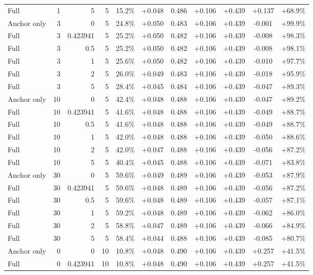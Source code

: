 \begin{table}[htbp]
\begin{tabular}{lrrrccccccc}
Full & 1 & 5 & 5 & 15.2\% & +0.048 & 0.486 & +0.106 & +0.439 & +0.137 & +68.9\% \\
Anchor only & 3 & 0 & 5 & 24.8\% & +0.050 & 0.483 & +0.106 & +0.439 & -0.001 & +99.9\% \\
Full & 3 & 0.423941 & 5 & 25.2\% & +0.050 & 0.482 & +0.106 & +0.439 & -0.008 & +98.3\% \\
Full & 3 & 0.5 & 5 & 25.2\% & +0.050 & 0.482 & +0.106 & +0.439 & -0.008 & +98.1\% \\
Full & 3 & 1 & 5 & 25.6\% & +0.050 & 0.482 & +0.106 & +0.439 & -0.010 & +97.7\% \\
Full & 3 & 2 & 5 & 26.0\% & +0.049 & 0.483 & +0.106 & +0.439 & -0.018 & +95.9\% \\
Full & 3 & 5 & 5 & 28.4\% & +0.045 & 0.484 & +0.106 & +0.439 & -0.047 & +89.3\% \\
Anchor only & 10 & 0 & 5 & 42.4\% & +0.048 & 0.488 & +0.106 & +0.439 & -0.047 & +89.2\% \\
Full & 10 & 0.423941 & 5 & 41.6\% & +0.048 & 0.488 & +0.106 & +0.439 & -0.049 & +88.7\% \\
Full & 10 & 0.5 & 5 & 41.6\% & +0.048 & 0.488 & +0.106 & +0.439 & -0.049 & +88.7\% \\
Full & 10 & 1 & 5 & 42.0\% & +0.048 & 0.488 & +0.106 & +0.439 & -0.050 & +88.6\% \\
Full & 10 & 2 & 5 & 42.0\% & +0.047 & 0.488 & +0.106 & +0.439 & -0.056 & +87.2\% \\
Full & 10 & 5 & 5 & 40.4\% & +0.045 & 0.488 & +0.106 & +0.439 & -0.071 & +83.8\% \\
Anchor only & 30 & 0 & 5 & 59.6\% & +0.049 & 0.489 & +0.106 & +0.439 & -0.053 & +87.9\% \\
Full & 30 & 0.423941 & 5 & 59.6\% & +0.048 & 0.489 & +0.106 & +0.439 & -0.056 & +87.2\% \\
Full & 30 & 0.5 & 5 & 59.6\% & +0.048 & 0.489 & +0.106 & +0.439 & -0.057 & +87.1\% \\
Full & 30 & 1 & 5 & 59.2\% & +0.048 & 0.489 & +0.106 & +0.439 & -0.062 & +86.0\% \\
Full & 30 & 2 & 5 & 58.8\% & +0.047 & 0.489 & +0.106 & +0.439 & -0.066 & +84.9\% \\
Full & 30 & 5 & 5 & 58.4\% & +0.044 & 0.488 & +0.106 & +0.439 & -0.085 & +80.7\% \\
Anchor only & 0 & 0 & 10 & 10.8\% & +0.048 & 0.490 & +0.106 & +0.439 & +0.257 & +41.5\% \\
Full & 0 & 0.423941 & 10 & 10.8\% & +0.048 & 0.490 & +0.106 & +0.439 & +0.257 & +41.5\% \\

\end{tabular}
\end{table}
